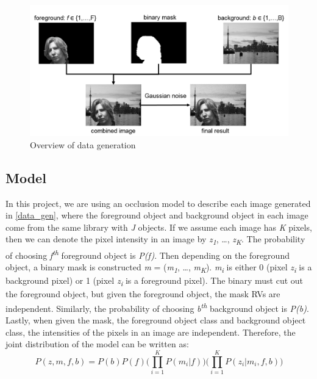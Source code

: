 \documentclass{article} %
\begin{document}
\begin{figure}[h]
\begin{center}
\includegraphics[width=1\textwidth]{data_generation}
\end{center}
\caption{Overview of data generation}
\label{fig:data_generation}
\end{figure}

\subsection{Model}
\label{model}
In this project, we are using an occlusion model to describe each image generated in \ref{data_gen}, where the foreground object and background object in each image come from the same library with \textit{J} objects. If we assume each image has \textit{K} pixels, then we can denote the pixel intensity in an image by \textit{z}\textsubscript{\textit{1}}, \ldots , \textit{z}\textsubscript{\textit{K}}. The probability of choosing \textit{f}\textsuperscript{\textit{th}} foreground object is \textit{P(f)}. Then depending on the foreground object, a binary mask is constructed \textit{m} = (\textit{m}\textsubscript{\textit{1}}, \ldots, \textit{m}\textsubscript{\textit{K}}). \textit{m}\textsubscript{\textit{i}} is either 0 (pixel \textit{z}\textsubscript{\textit{i}} is a background pixel) or 1 (pixel \textit{z}\textsubscript{\textit{i}} is a foreground pixel). The binary must cut out the foreground object, but given the foreground object, the mask RVs are independent. Similarly, the probability of choosing \textit{b}\textsuperscript{\textit{th}} background object is \textit{P(b)}. Lastly, when given the mask, the foreground object class and background object class, the intensities of the pixels in an image are independent. Therefore, the joint distribution of the model can be written as:
\begin{equation}
P(z,m,f,b) = P(b)P(f)\Bigg( \prod_{i=1}^KP(m_{i}|f)\Bigg)\Bigg( \prod_{i=1}^KP(z_{i}|m_{i},f,b)\Bigg)
\label{eq:eq1}
\end{equation}
\end{document}
